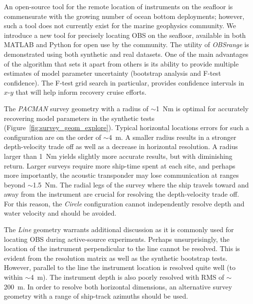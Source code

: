 An open-source tool for the remote location of instruments on the seafloor is commensurate with the growing number of ocean bottom deployments; however, such a tool does not currently exist for the marine geophysics community. We introduce a new tool for precisely locating OBS on the seafloor, available in both MATLAB and Python for open use by the community. The utility of \textit{OBSrange} is demonstrated using both synthetic and real datasets. One of the main advantages of the algorithm that sets it apart from others is its ability to provide multiple estimates of model parameter uncertainty (bootstrap analysis and F-test confidence). The F-test grid search in particular, provides confidence intervals in $x$-$y$ that will help inform recovery cruise efforts.

The \textit{PACMAN} survey geometry with a radius of $\sim$1~Nm is optimal for accurately recovering model parameters in the synthetic tests (Figure~\ref{fig:survey_geom_explore}). Typical horizontal locations errors for such a configuration are on the order of $\sim$4~m. A smaller radius results in a stronger depth-velocity trade off as well as a decrease in horizontal resolution. A radius larger than 1~Nm yields slightly more accurate results, but with diminishing return. Larger surveys require more ship-time spent at each site, and perhaps more importantly, the acoustic transponder may lose communication at ranges beyond $\sim$1.5~Nm. The radial legs of the survey where the ship travels toward and away from the instrument are crucial for resolving the depth-velocity trade off. For this reason, the \textit{Circle} configuration cannot independently resolve depth and water velocity and should be avoided. 

The \textit{Line} geometry warrants additional discussion as it is commonly used for locating OBS during active-source experiments. Perhaps unsurprisingly, the location of the instrument perpendicular to the line cannot be resolved. This is evident from the resolution matrix as well as the synthetic bootstrap tests. However, parallel to the line the instrument location is resolved quite well (to within $\sim$4~m). The instrument depth is also poorly resolved with RMS of $\sim$200~m. In order to resolve both horizontal dimensions, an alternative survey geometry with a range of ship-track azimuths should be used.

